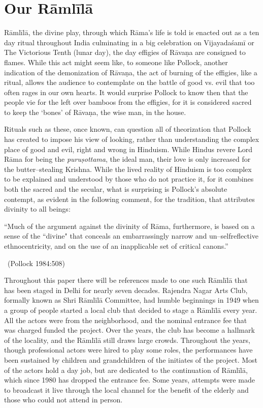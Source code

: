 \section*{Our Rāmlīlā}

Rāmlīlā, the divine play, through which Rāma’s life is told is enacted out as a ten day ritual throughout India culminating in a big celebration on Vijayadaśamī or The Victorious Tenth (lunar day), the day effigies of Rāvaṇa are consigned to flames. While this act might seem like, to someone like Pollock, another indication of the demonization of Rāvaṇa, the act of burning of the effigies, like a ritual, allows the audience to contemplate on the battle of good vs. evil that too often rages in our own hearts. It would surprise Pollock to know then that the people vie for the left over bamboos from the effigies, for it is considered sacred to keep the ‘bones’ of Rāvaṇa, the wise man, in the house.

Rituals such as these, once known, can question all of theorization that Pollock has created to impose his view of looking, rather than understanding the complex place of good and evil, right and wrong in Hinduism. While Hindus revere Lord Rāma for being the \textit{puruṣottama}, the ideal man, their love is only increased for the butter–stealing Krishna. While the lived reality of Hinduism is too complex to be explained and understood by those who do not practice it, for it combines both the sacred and the secular, what is surprising is Pollock’s absolute contempt, as evident in the following comment, for the tradition, that attributes divinity to all beings:

\begin{myquote}
“Much of the argument against the divinity of Rāma, furthermore, is based on a sense of the “divine" that conceals an embarrassingly narrow and un–selfreflective ethnocentricity, and on the use of an inapplicable set of critical canons.”

~\hfill (Pollock 1984:508)
\end{myquote}

Throughout this paper there will be references made to one such Rāmlīlā that has been staged in Delhi for nearly seven decades. Rajendra Nagar Arts Club, formally known as Shri Rāmlīlā Committee, had humble beginnings in 1949 when a group of people started a local club that decided to stage a Rāmlīlā every year. All the actors were from the neighborhood, and the nominal entrance fee that was charged funded the project. Over the years, the club has become a hallmark of the locality, and the Rāmlīlā still draws large crowds. Throughout the years, though professional actors were hired to play some roles, the performances have been sustained by children and grandchildren of the initiates of the project. Most of the actors hold a day job, but are dedicated to the continuation of Rāmlīlā, which since 1980 has dropped the entrance fee. Some years, attempts were made to broadcast it live through the local channel for the benefit of the elderly and those who could not attend in person.

